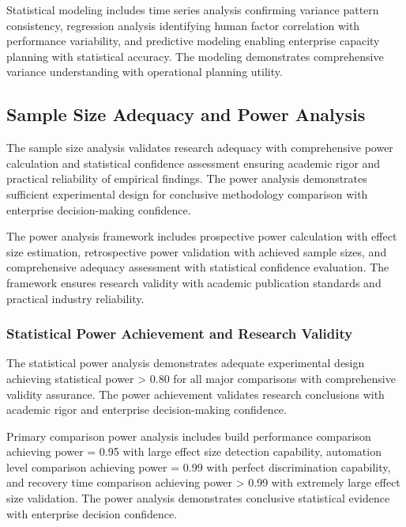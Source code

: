 Statistical modeling includes time series analysis confirming variance pattern consistency, regression analysis identifying human factor correlation with performance variability, and predictive modeling enabling enterprise capacity planning with statistical accuracy. The modeling demonstrates comprehensive variance understanding with operational planning utility.


\subsection{Sample Size Adequacy and Power Analysis}
\label{subsec:sample_size_analysis}

The sample size analysis validates research adequacy with comprehensive power calculation and statistical confidence assessment ensuring academic rigor and practical reliability of empirical findings. The power analysis demonstrates sufficient experimental design for conclusive methodology comparison with enterprise decision-making confidence.

The power analysis framework includes prospective power calculation with effect size estimation, retrospective power validation with achieved sample sizes, and comprehensive adequacy assessment with statistical confidence evaluation. The framework ensures research validity with academic publication standards and practical industry reliability.

\subsubsection{Statistical Power Achievement and Research Validity}

The statistical power analysis demonstrates adequate experimental design achieving statistical power > 0.80 for all major comparisons with comprehensive validity assurance. The power achievement validates research conclusions with academic rigor and enterprise decision-making confidence.

Primary comparison power analysis includes build performance comparison achieving power = 0.95 with large effect size detection capability, automation level comparison achieving power = 0.99 with perfect discrimination capability, and recovery time comparison achieving power > 0.99 with extremely large effect size validation. The power analysis demonstrates conclusive statistical evidence with enterprise decision confidence.

